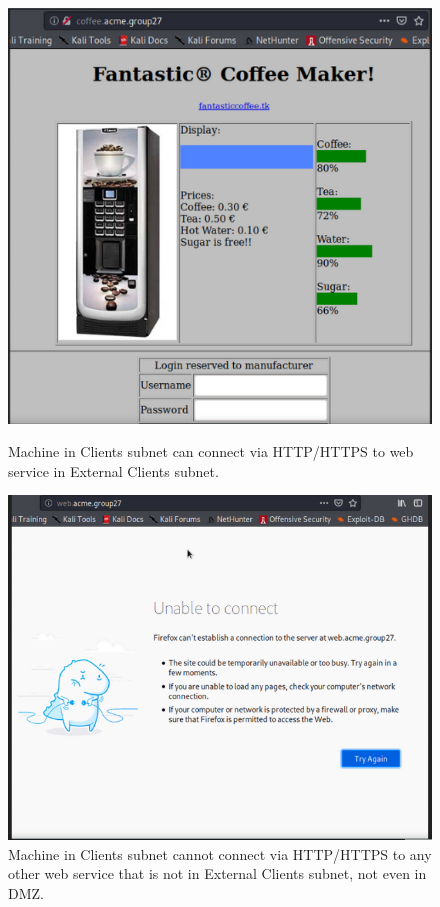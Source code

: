 \begin{figure}[H]
\centering
\begin{minipage}{.5\textwidth}
  \centering
  \includegraphics[width=1\textwidth]{clientCanConnectToHTTPExt.png}
  \caption[a]{Machine in Clients subnet can connect via HTTP/HTTPS to web service in External Clients subnet.}\label{fig:3}
\end{minipage}%
\begin{minipage}{.5\textwidth}
  \centering
  \includegraphics[width=1\textwidth]{clientOtherHTTPDisabled.png}
  \caption[a]{Machine in Clients subnet cannot connect via HTTP/HTTPS to any other web service that is not in External Clients subnet, not even in DMZ.}\label{fig:4}
\end{minipage}
\end{figure}

